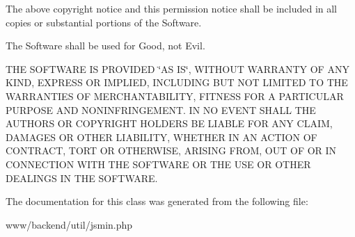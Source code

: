The above copyright notice and this permission notice shall be included in all copies or substantial portions of the Software.

The Software shall be used for Good, not Evil.

THE SOFTWARE IS PROVIDED \char`\"{}AS IS\char`\"{}, WITHOUT WARRANTY OF ANY KIND, EXPRESS OR IMPLIED, INCLUDING BUT NOT LIMITED TO THE WARRANTIES OF MERCHANTABILITY, FITNESS FOR A PARTICULAR PURPOSE AND NONINFRINGEMENT. IN NO EVENT SHALL THE AUTHORS OR COPYRIGHT HOLDERS BE LIABLE FOR ANY CLAIM, DAMAGES OR OTHER LIABILITY, WHETHER IN AN ACTION OF CONTRACT, TORT OR OTHERWISE, ARISING FROM, OUT OF OR IN CONNECTION WITH THE SOFTWARE OR THE USE OR OTHER DEALINGS IN THE SOFTWARE. 

The documentation for this class was generated from the following file:\begin{DoxyCompactItemize}
\item 
www/backend/util/jsmin.php\end{DoxyCompactItemize}
